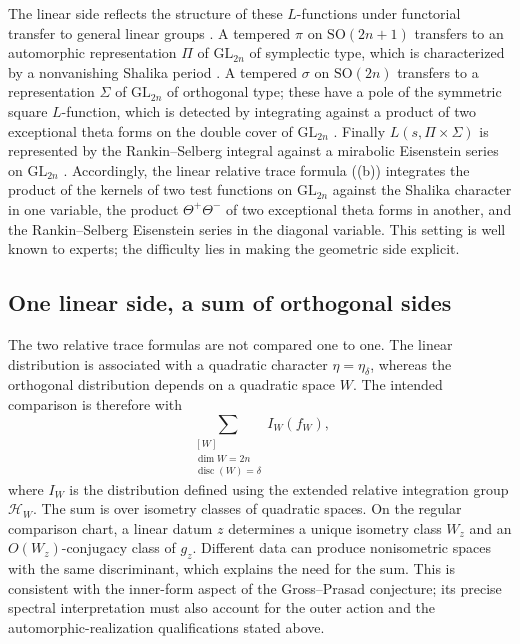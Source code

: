 \documentclass[11pt,oneside,notitlepage]{book}
\numberwithin{equation}{section}
\theoremstyle{plain}
\theoremstyle{definition}
\newcommand{\GL}{\mathrm{GL}}
\newcommand{\SO}{\mathrm{SO}}
\begin{document}
The linear side reflects the structure of these $L$-functions under functorial transfer to general linear groups \cite{Arthur}. A tempered $\pi$ on $\SO(2n+1)$ transfers to an automorphic representation $\Pi$ of $\GL_{2n}$ of symplectic type, which is characterized by a nonvanishing Shalika period \cite{JS}. A tempered $\sigma$ on $\SO(2n)$ transfers to a representation $\Sigma$ of $\GL_{2n}$ of orthogonal type; these have a pole of the symmetric square $L$-function, which is detected by integrating against a product of two exceptional theta forms on the double cover of $\GL_{2n}$ \cite{BG,Takeda}. Finally $L(s,\Pi\times\Sigma)$ is represented by the Rankin--Selberg integral against a mirabolic Eisenstein series on $\GL_{2n}$ \cite{JPSS}. Accordingly, the linear relative trace formula ((b)) integrates the product of the kernels of two test functions on $\GL_{2n}$ against the Shalika character in one variable, the product $\Theta^+\Theta^-$ of two exceptional theta forms in another, and the Rankin--Selberg Eisenstein series in the diagonal variable. This setting is well known to experts; the difficulty lies in making the geometric side explicit.

\subsection*{One linear side, a sum of orthogonal sides}
The two relative trace formulas are not compared one to one. The linear distribution is associated with a quadratic character \(\eta=\eta_\delta\), whereas the orthogonal distribution depends on a quadratic space \(W\). The intended comparison is therefore with
\[
\sum_{\substack{[W]\\ \dim W=2n\\ \operatorname{disc}(W)=\delta}} I_W(f_W),
\]
where \(I_W\) is the distribution defined using the extended relative integration group \(\mathcal H_W\). The sum is over isometry classes of quadratic spaces. On the regular comparison chart, a linear datum \(z\) determines a unique isometry class \(W_z\) and an \(O(W_z)\)-conjugacy class of \(g_z\). Different data can produce nonisometric spaces with the same discriminant, which explains the need for the sum. This is consistent with the inner-form aspect of the Gross–Prasad conjecture; its precise spectral interpretation must also account for the outer action and the automorphic-realization qualifications stated above.
\end{document}
